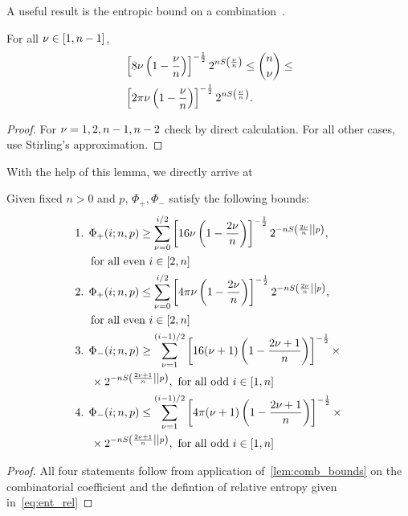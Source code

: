 A useful result is the entropic bound on a combination~\cite{cit:ash}.
\begin{lemma}\label{lem:comb_bounds}
	For all $\nu\in [1,n-1]$,
	\begin{align}
		&\left[ 8\nu\left(1-\frac{\nu}{n}\right) \right]^{-\frac{1}{2}} 2^{n S\left(\frac{\nu}{n}\right)} \leq \binom{n}{\nu} \leq \\
		&\left[ 2\pi \nu\left(1-\frac{\nu}{n}\right) \right]^{-\frac{1}{2}} 2^{n S\left(\frac{\nu}{n}\right)}.
	\end{align}
\end{lemma}
\begin{proof}
	For $\nu = 1,2, n-1, n-2$ check by direct calculation.	
	For all other cases, use Stirling's approximation. 
\end{proof}
With the help of this lemma, we directly arrive at 
\begin{theorem}\label{thm:bounds_strict}
	Given fixed $n>0$ and $p$, $\Phi_+, \Phi_-$ satisfy the following bounds:
	\begin{align*}
		\begin{split}
		&\text{1. } \Phi_+(i; n, p) \geq \sum\limits_{\nu=0}^{i/2}\left[ 16\nu\left(1-\frac{2\nu}{n}\right) \right]^{-\frac{1}{2}} 2^{-nS\left( \frac{2\nu}{n} \middle\vert\middle\vert p \right)}, \\
		&\hspace{14pt} \text{for all even } i\in [2,n] \\
		&\text{2. } \Phi_+(i; n, p) \leq \sum\limits_{\nu=0}^{i/2}\left[ 4\pi\nu\left(1-\frac{2\nu}{n}\right) \right]^{-\frac{1}{2}} 2^{-nS\left( \frac{2\nu}{n} \middle\vert\middle\vert p \right)}, \\
		&\hspace{14pt} \text{for all even } i\in [2,n] \\
		&\text{3. } \Phi_-(i; n, p) \geq \sum\limits_{\nu=1}^{(i-1)/2}\left[ 16(\nu+1)\left(1-\frac{2\nu+1}{n}\right) \right]^{-\frac{1}{2}} \times \\
		&\hspace{14pt} \times 2^{-nS\left( \frac{2\nu+1}{n} \middle\vert\middle\vert p \right)},\ \text{for all odd }i\in [1,n] \\
		&\text{4. } \Phi_-(i; n, p) \leq \sum\limits_{\nu=1}^{(i-1)/2}\left[ 4\pi(\nu+1)\left(1-\frac{2\nu+1}{n}\right) \right]^{-\frac{1}{2}} \times \\
		&\hspace{14pt} \times 2^{-nS\left( \frac{2\nu+1}{n} \middle\vert\middle\vert p \right)},\ \text{for all odd } i\in [1,n]
		\end{split}
	\end{align*}
\end{theorem}
\begin{proof}
	All four statements follow from application of~\cref{lem:comb_bounds} on the combinatorial coefficient and the defintion of relative entropy given in~\cref{eq:ent_rel}
\end{proof}

